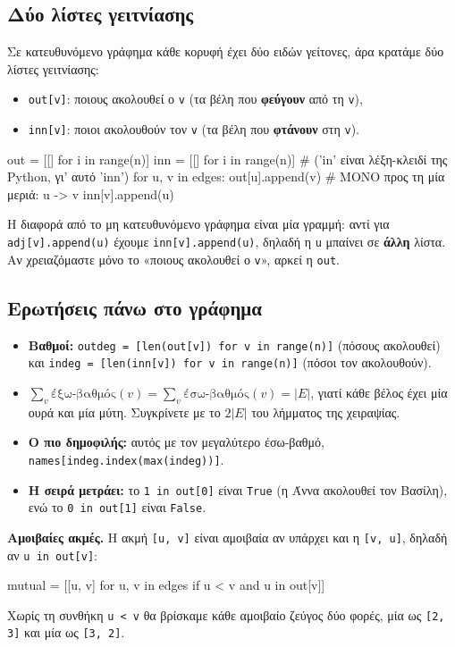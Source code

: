 \documentclass[11pt,a4paper]{article}
\newcommand{\code}[1]{\texttt{#1}}
\renewcommand{\_}{\textunderscore\allowbreak}
\begin{document}
\subsection{Δύο λίστες γειτνίασης}
Σε κατευθυνόμενο γράφημα κάθε κορυφή έχει δύο ειδών γείτονες, άρα κρατάμε δύο λίστες γειτνίασης:
\begin{itemize}
  \item \code{out[v]}: ποιους ακολουθεί ο \code{v} (τα βέλη που \textbf{φεύγουν} από τη \code{v}),
  \item \code{inn[v]}: ποιοι ακολουθούν τον \code{v} (τα βέλη που \textbf{φτάνουν} στη \code{v}).
\end{itemize}

\begin{Piton}
out = [[] for i in range(n)]
inn = [[] for i in range(n)]      # ('in' είναι λέξη-κλειδί της Python, γι' αυτό 'inn')
for u, v in edges:
    out[u].append(v)              # ΜΟΝΟ προς τη μία μεριά: u -> v
    inn[v].append(u)
\end{Piton}

Η διαφορά από το μη κατευθυνόμενο γράφημα είναι μία γραμμή: αντί για \code{adj[v].append(u)}
έχουμε \code{inn[v].append(u)}, δηλαδή η \code{u} μπαίνει σε \textbf{άλλη} λίστα. Αν χρειαζόμαστε
μόνο το «ποιους ακολουθεί ο \code{v}», αρκεί η \code{out}.

\subsection{Ερωτήσεις πάνω στο γράφημα}
\begin{itemize}
  \item \textbf{Βαθμοί:} \code{out\_deg = [len(out[v]) for v in range(n)]} (πόσους ακολουθεί) και
        \code{in\_deg = [len(inn[v]) for v in range(n)]} (πόσοι τον ακολουθούν).
  \item $\sum_v \text{έξω-βαθμός}(v) = \sum_v \text{έσω-βαθμός}(v) = |E|$, γιατί κάθε βέλος έχει μία
        ουρά και μία μύτη. Συγκρίνετε με το $2|E|$ του λήμματος της χειραψίας.
  \item \textbf{Ο πιο δημοφιλής:} αυτός με τον μεγαλύτερο έσω-βαθμό,
        \code{names[in\_deg.index(max(in\_deg))]}.
  \item \textbf{Η σειρά μετράει:} το \code{1 in out[0]} είναι \code{True} (η Άννα ακολουθεί τον
        Βασίλη), ενώ το \code{0 in out[1]} είναι \code{False}.
\end{itemize}

\textbf{Αμοιβαίες ακμές.} Η ακμή \code{[u, v]} είναι αμοιβαία αν υπάρχει και η \code{[v, u]}, δηλαδή
αν \code{u in out[v]}:
\begin{Piton}
mutual = [[u, v] for u, v in edges if u < v and u in out[v]]
\end{Piton}
Χωρίς τη συνθήκη \code{u < v} θα βρίσκαμε κάθε αμοιβαίο ζεύγος δύο φορές, μία ως \code{[2, 3]} και
μία ως \code{[3, 2]}.
\end{document}
